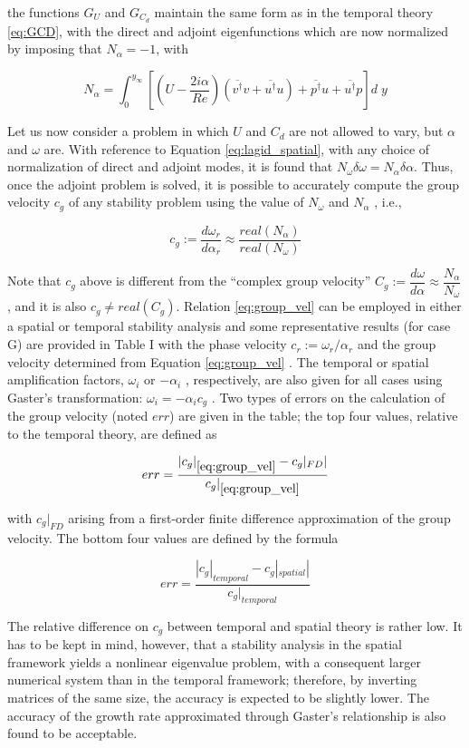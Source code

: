 the functions $G_U$ and $G_{C_d}$ maintain the same form as in the temporal theory \ref{eq:GCD}, with the direct and
adjoint eigenfunctions which are now normalized by imposing that $N_{\alpha} = -1$, with

$$
N_{\alpha} = \int_0^{y_{\infty}} \left[ \left(U - \dfrac{2i\alpha}{Re}\right) ( \overline{ v^{\dagger}} v +  \overline{ u^{\dagger}} u  )   +  \overline{ p^{\dagger}} u +  \overline{ u^{\dagger}} p  \right] d \; y
$$

Let us now consider a problem in which $U$ and $C_d$ are not allowed to vary, but $\alpha$ and $\omega$ are.
With reference to Equation \ref{eq:lagid_spatial}, with any choice of normalization of direct and adjoint modes, it
is found that $ N_{\omega} \delta \omega = N_{\alpha} \delta \alpha $. Thus, once the adjoint problem is solved, it is possible to accurately
compute the group velocity $c_g$ of any stability problem using the value of $ N_{\omega}$ and $ N_{\alpha}$ , i.e.,

\begin{equation}
c_g := \dfrac{d \omega_r}{d \alpha_r} \approx \dfrac{real(N_{\alpha})}{real(N_{\omega})}
\label{eq:group_vel}
\end{equation}

Note that $c_g$ above is different from the “complex group velocity” $C_g := \dfrac{d \omega}{d \alpha} \approx  \dfrac{N_{\alpha}}{N_{\omega}}$ , and it is also
$c_g \neq real(C_g)$. Relation \ref{eq:group_vel} can be employed in either a spatial or temporal stability analysis and
some representative results (for case G) are provided in Table I with the phase velocity $c_r := \omega_r / \alpha_r$
and the group velocity determined from Equation \ref{eq:group_vel} . The temporal or spatial amplification factors, $\omega_i$ or $-\alpha_i$ , respectively, are also given for all cases using Gaster’s transformation: $\omega_i = - \alpha_i c_g$ .
Two types of errors on the calculation of the group velocity (noted $err$) are given in the table; the top
four values, relative to the temporal theory, are defined as

$$
err = \dfrac{|c_g|_{\ref{eq:group_vel}} - c_g|_{FD}|}{c_g|_{\ref{eq:group_vel}}}
$$

with $c_g|_{FD}$ arising from a first-order finite difference approximation of the group velocity. The
bottom four values are defined by the formula

$$
err = \dfrac{|c_g|_{temporal} - c_g|_{spatial}|}{c_g|_{temporal}}
$$

The relative difference on $c_g$ between temporal and spatial theory is rather low. It has to be kept
in mind, however, that a stability analysis in the spatial framework yields a nonlinear eigenvalue
problem, with a consequent larger numerical system than in the temporal framework; therefore, by
inverting matrices of the same size, the accuracy is expected to be slightly lower. The accuracy of
the growth rate approximated through Gaster’s relationship is also found to be acceptable.

